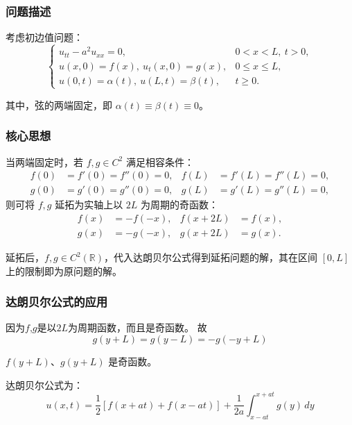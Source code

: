 \documentclass[12pt,a4paper]{article}
\numberwithin{subsection}{section}   %
\numberwithin{subsubsection}{subsection}
\theoremstyle{plain}
\theoremstyle{definition}
\theoremstyle{remark}
\theoremstyle{remark}
\begin{document}
\subsubsection{问题描述}
考虑初边值问题：
\begin{equation}
	\begin{cases}
		u_{tt} - a^2 u_{xx} = 0, & 0 < x < L, \ t > 0, \\
		u(x, 0) = f(x), \ u_t(x, 0) = g(x), & 0 \leq x \leq L, \\
		u(0, t) = \alpha(t), \ u(L, t) = \beta(t), & t \geq 0.
	\end{cases}
\end{equation}

其中，弦的两端固定，即 \(\alpha(t) \equiv \beta(t) \equiv 0\)。

\subsubsection{核心思想}
当两端固定时，若 \(f, g \in C^2\) 满足相容条件：
\begin{equation}
	\begin{aligned}
		f(0) &= f'(0) = f''(0) = 0, & f(L) &= f'(L) = f''(L) = 0, \\
		g(0) &= g'(0) = g''(0) = 0, & g(L) &= g'(L) = g''(L) = 0,
	\end{aligned}
\end{equation}
则可将 \(f, g\) 延拓为实轴上以 \(2L\) 为周期的奇函数：
\begin{equation}
	\begin{aligned}
		f(x) &= -f(-x), & f(x + 2L) &= f(x), \\
		g(x) &= -g(-x), & g(x + 2L) &= g(x).
	\end{aligned}
\end{equation}

延拓后，\(f, g \in C^2(\mathbb{R})\)，代入达朗贝尔公式得到延拓问题的解，其在区间 \([0, L]\) 上的限制即为原问题的解。

\subsubsection{达朗贝尔公式的应用}
因为$f$,$g$是以$2L$为周期函数，而且是奇函数。
故
\begin{equation}
g(y + L) = g(y - L) = -g(-y + L)
\end{equation}

$f(y + L)$、$g(y + L)$ 是奇函数。



达朗贝尔公式为：
\begin{equation}
	u(x,t) = \frac{1}{2} \left[ f(x + at) + f(x - at) \right] + \frac{1}{2a} \int_{x - at}^{x + at} g(y) \, dy
\end{equation}
\end{document}
